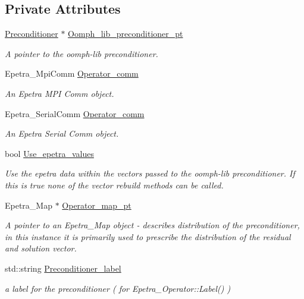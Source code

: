 \subsection*{Private Attributes}
\begin{DoxyCompactItemize}
\item 
\hyperlink{classoomph_1_1Preconditioner}{Preconditioner} $\ast$ \hyperlink{classoomph_1_1OomphLibPreconditionerEpetraOperator_a19407c48b77a021c8e714232d296ecd0}{Oomph\+\_\+lib\+\_\+preconditioner\+\_\+pt}
\begin{DoxyCompactList}\small\item\em A pointer to the oomph-\/lib preconditioner. \end{DoxyCompactList}\item 
Epetra\+\_\+\+Mpi\+Comm \hyperlink{classoomph_1_1OomphLibPreconditionerEpetraOperator_a319c368461dabf218b9589dfc8d47f14}{Operator\+\_\+comm}
\begin{DoxyCompactList}\small\item\em An Epetra M\+PI Comm object. \end{DoxyCompactList}\item 
Epetra\+\_\+\+Serial\+Comm \hyperlink{classoomph_1_1OomphLibPreconditionerEpetraOperator_a093d431cfa9ad601e1ead0dd324b3d49}{Operator\+\_\+comm}
\begin{DoxyCompactList}\small\item\em An Epetra Serial Comm object. \end{DoxyCompactList}\item 
bool \hyperlink{classoomph_1_1OomphLibPreconditionerEpetraOperator_a47942736149f13371582896aedf80f24}{Use\+\_\+epetra\+\_\+values}
\begin{DoxyCompactList}\small\item\em Use the epetra data within the vectors passed to the oomph-\/lib preconditioner. If this is true none of the vector rebuild methods can be called. \end{DoxyCompactList}\item 
Epetra\+\_\+\+Map $\ast$ \hyperlink{classoomph_1_1OomphLibPreconditionerEpetraOperator_af111fc1ede49a86c5ed37ad1f5573e2e}{Operator\+\_\+map\+\_\+pt}
\begin{DoxyCompactList}\small\item\em A pointer to an Epetra\+\_\+\+Map object -\/ describes distribution of the preconditioner, in this instance it is primarily used to prescribe the distribution of the residual and solution vector. \end{DoxyCompactList}\item 
std\+::string \hyperlink{classoomph_1_1OomphLibPreconditionerEpetraOperator_a9f1c739fe5868b1d9dcaee080d63cb5b}{Preconditioner\+\_\+label}
\begin{DoxyCompactList}\small\item\em a label for the preconditioner ( for Epetra\+\_\+\+Operator\+::\+Label() ) \end{DoxyCompactList}\end{DoxyCompactItemize}


